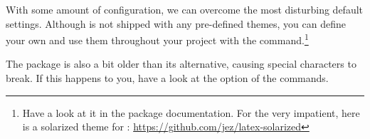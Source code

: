 With some amount of configuration, we can overcome the most disturbing default settings.
Although  is not shipped with any pre-defined themes, you can define your own and use them throughout your project with the  command.\footnote{Have a look at it in the package documentation. For the very impatient, here is a solarized theme for : \url{https://github.com/jez/latex-solarized}}

The package is also a bit older than its alternative, causing  special characters to break. 
If this happens to you, have a look at the  option of the  commands.
